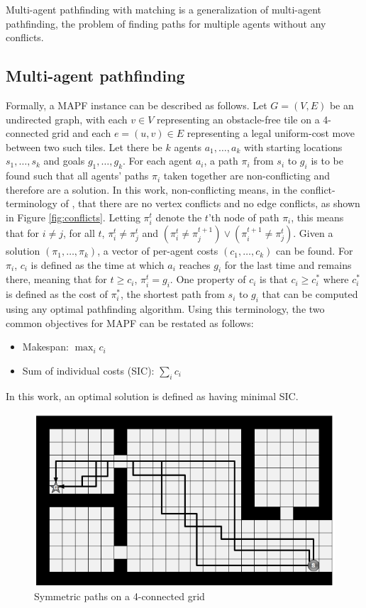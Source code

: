 \documentclass[english]{article}
\begin{document}
	Multi-agent pathfinding with matching is a generalization of multi-agent pathfinding, the problem of finding paths for multiple agents without any conflicts. 
	\subsection{Multi-agent pathfinding}
	
	Formally, a MAPF instance can be described as follows. Let $G = (V,E)$ be an undirected graph, with each $v\in V$ representing an obstacle-free tile on a 4-connected grid and each $e = (u,v)\in E$ representing a legal uniform-cost move between two such tiles. Let there be $k$ agents $a_1,\ldots,a_k$ with starting locations $s_1,\ldots,s_k$ and goals $g_1,\ldots,g_k$. For each agent $a_i$, a path $\pi_i$ from $s_i$ to $g_i$ is to be found such that all agents' paths $\pi_i$ taken together are non-conflicting and therefore are a solution. In this work, non-conflicting means, in the conflict-terminology of \cite{stern2019}, that there are no vertex conflicts and no edge conflicts, as shown in Figure \ref{fig:conflicts}. Letting $\pi_i^t$ denote the $t$'th node of path $\pi_i$, this means that for $i\neq j$, for all $t$, $\pi_i^t\neq \pi_j^t$ and $(\pi_i^t \neq \pi_j^{t + 1})\lor(\pi_i^{t+1} \neq \pi_j^t)$. Given a solution $(\pi_1,\ldots,\pi_k)$, a vector of per-agent costs $(c_1,\ldots,c_k)$ can be found. For $\pi_i$, $c_i$ is defined as the time at which $a_i$ reaches $g_i$ for the last time and remains there, meaning that for $t \geq c_i$, $\pi_i^{t} = g_i$. One property of $c_i$ is that $c_i \geq c^*_i$ where $c^*_i$ is defined as the cost of $\pi^*_i$, the shortest path from $s_i$ to $g_i$ that can be computed using any optimal pathfinding algorithm. Using this terminology, the two common objectives for MAPF can be restated as follows:
	\begin{itemize}
		\item Makespan: $\max_{i} c_i$
		\item Sum of individual costs (SIC): $\sum_i c_i$
	\end{itemize}
	In this work, an optimal solution is defined as having minimal SIC.
	
	\begin{figure}
		\vspace{-10pt}
		\centering
		\includegraphics[width=\linewidth]{img/symmetries}
		\caption{Symmetric paths on a 4-connected grid \cite{harabor2010}}
		\label{fig:symmetries}
	\end{figure}
	
\end{document}
